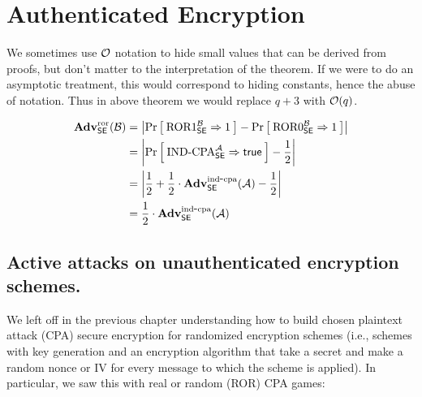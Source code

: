 \section{Authenticated Encryption}
\label{sec:authenc}

We sometimes use ${\cal O}$ notation to hide small values that can be derived from
proofs, but don't matter to the interpretation of the theorem. If we were to do
an asymptotic treatment, this would correspond to hiding constants, hence the
abuse of notation.  Thus in above theorem we would replace $q+3$ with
${\cal O}(q)$. \\



\begin{align*}
\mathbf{Adv}^{\mathrm{ror}}_{{\mathsf{SE}}}({\mathcal B}) 
    &= \left|\Pr\left[\: \textnormal{ROR}1_{\mathsf{SE}}^{\mathcal B}\Rightarrow 1 \:\right] -
                                \Pr\left[\: \textnormal{ROR}0_{\mathsf{SE}}^{\mathcal B}\Rightarrow 1 \:\right]\right|\\
    &= \left|\Pr\left[\: \textnormal{IND-CPA}_{\mathsf{SE}}^{\mathcal A}\Rightarrow\mathsf{true} \:\right] - \frac{1}{2}\right|\\
    &= \left|\frac{1}{2} +
    \frac{1}{2}\cdot\mathbf{Adv}^{\mathrm{ind\mbox{-} cpa}}_{{\mathsf{SE}}}({\mathcal A}) - \frac{1}{2}\right|\\
    &= \frac{1}{2}\cdot\mathbf{Adv}^{\mathrm{ind\mbox{-} cpa}}_{{\mathsf{SE}}}({\mathcal A})
\end{align*}



\subsection{Active attacks on unauthenticated encryption schemes.}
We left off in the previous chapter understanding how to build chosen plaintext attack (CPA) secure encryption for randomized encryption schemes (i.e., schemes with key generation and an encryption algorithm that take a secret and make a random nonce or IV for every message to which the scheme is applied). In particular, we saw this with real or random (ROR) CPA games:

